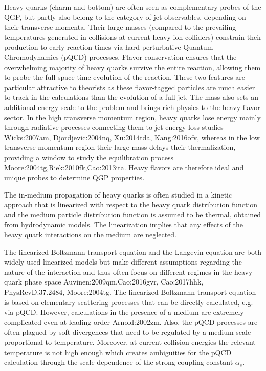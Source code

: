 Heavy quarks (charm and bottom) are often seen as complementary probes of the QGP, but partly also belong to the category of jet observables, depending on their transverse momenta. Their large masses (compared to the prevailing temperatures generated in collisions at current heavy-ion colliders) constrain their production to early reaction times via hard perturbative Quantum-Chromodynamics (pQCD) processes. Flavor conservation ensures that the overwhelming majority of heavy quarks survive the entire reaction, allowing them to probe the full space-time evolution of the reaction.
These two features are particular attractive to theorists as these flavor-tagged particles are much easier to track in the calculations than the evolution of a full jet.
The mass also sets an additional energy scale to the problem and brings rich physics to the heavy-flavor sector.
In the high transverse momentum region, heavy quarks lose energy mainly through radiative processes connecting them to jet energy loss studies {Wicks:2007am, Djordjevic:2004nq, Xu:2014tda, Kang:2016ofv}, whereas
in the low transverse momentum region their large mass delays their thermalization, providing a window to study the equilibration process {Moore:2004tg,Riek:2010fk,Cao:2013ita}.
Heavy flavors are therefore ideal and unique probes to determine QGP properties.

The in-medium propagation of heavy quarks is often studied in a kinetic approach that is linearized with respect to the heavy quark distribution function and the medium particle distribution function is assumed to be thermal, obtained from hydrodynamic models.
The linearization implies that any effects of the heavy quark interactions on the medium are neglected.

The linearized Boltzmann transport equation and the Langevin equation are both widely used linearized models but make different assumptions regarding the nature of the interaction and thus often focus on different regimes in the heavy quark phase space {Auvinen:2009qm,Cao:2016gvr, Cao:2017hhk, PhysRevD.37.2484, Moore:2004tg}.
The linearized Boltzmann transport equation is based on elementary scattering processes that can be directly calculated, e.g. via pQCD.
However, calculations in the presence of a medium are extremely complicated even at leading order {Arnold:2002zm}.
Also, the pQCD processes are often plagued by soft divergences that need to be regulated by a medium scale proportional to temperature. Moreover, at current collision energies the relevant temperature is not high enough which creates ambiguities for the pQCD calculation through the scale dependence of the strong coupling constant $\alpha_s$.

